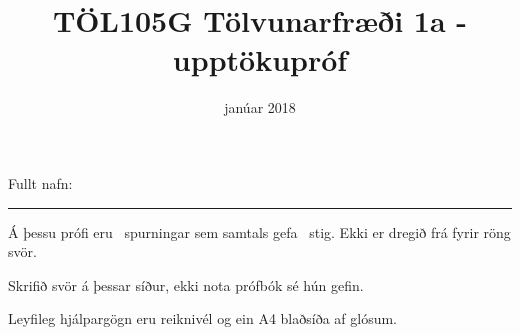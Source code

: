 \documentclass[addpoints]{exam}
\author{}
\date{}
\title{TÖL105G Tölvunarfræði 1a - upptökupróf}
\author{}
\date{janúar 2018}
\begin{document}
Fullt nafn: \vspace*{1mm} \hrule
\vspace*{0.5cm}

\begin{center}
\begin{minipage}{.8\textwidth}
Á þessu prófi eru \numquestions\ spurningar sem samtals gefa \numpoints\ stig.
Ekki er dregið frá fyrir röng svör.

Skrifið svör á þessar síður, ekki nota prófbók sé hún gefin.

Leyfileg hjálpargögn eru reiknivél og ein A4 blaðsíða af glósum.
\end{minipage}
\end{center}

\vspace{1cm}
\end{document}
